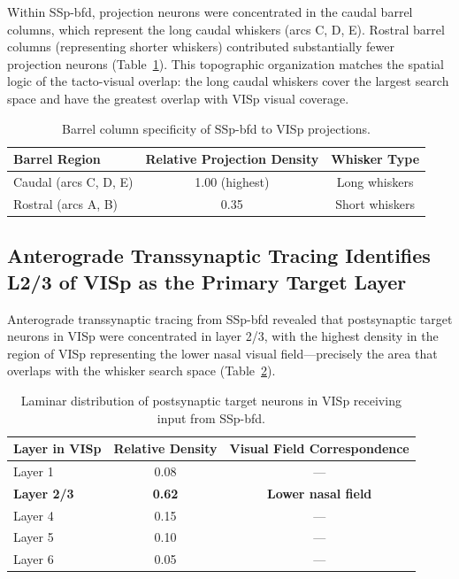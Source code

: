 \documentclass[11pt]{article}
\begin{document}
Within SSp-bfd, projection neurons were concentrated in the caudal barrel columns, which represent the long caudal whiskers (arcs C, D, E). Rostral barrel columns (representing shorter whiskers) contributed substantially fewer projection neurons (Table~\ref{tab:barrel_specificity}). This topographic organization matches the spatial logic of the tacto-visual overlap: the long caudal whiskers cover the largest search space and have the greatest overlap with VISp visual coverage.

\begin{table}[H]
\centering
\caption{Barrel column specificity of SSp-bfd to VISp projections.}
\label{tab:barrel_specificity}
\begin{tabular}{lcc}
\toprule
\textbf{Barrel Region} & \textbf{Relative Projection Density} & \textbf{Whisker Type} \\
\midrule
Caudal (arcs C, D, E) & 1.00 (highest) & Long whiskers \\
Rostral (arcs A, B) & 0.35 & Short whiskers \\
\bottomrule
\end{tabular}
\end{table}

\subsection{Anterograde Transsynaptic Tracing Identifies L2/3 of VISp as the Primary Target Layer}

Anterograde transsynaptic tracing from SSp-bfd revealed that postsynaptic target neurons in VISp were concentrated in layer 2/3, with the highest density in the region of VISp representing the lower nasal visual field---precisely the area that overlaps with the whisker search space (Table~\ref{tab:target_layer}).

\begin{table}[H]
\centering
\caption{Laminar distribution of postsynaptic target neurons in VISp receiving input from SSp-bfd.}
\label{tab:target_layer}
\begin{tabular}{lcc}
\toprule
\textbf{Layer in VISp} & \textbf{Relative Density} & \textbf{Visual Field Correspondence} \\
\midrule
Layer 1 & 0.08 & --- \\
\textbf{Layer 2/3} & \textbf{0.62} & \textbf{Lower nasal field} \\
Layer 4 & 0.15 & --- \\
Layer 5 & 0.10 & --- \\
Layer 6 & 0.05 & --- \\
\bottomrule
\end{tabular}
\end{table}
\end{document}
